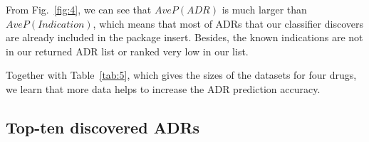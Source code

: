 From Fig.~\ref{fig:4}, we can see that $AveP(ADR)$ is much larger than $AveP(Indication)$, which means that most of ADRs that our classifier discovers are already included in the package insert. Besides, the known indications are not in our returned ADR list or ranked very low in our list.

Together with Table~\ref{tab:5}, which gives the sizes of the datasets for four drugs, we learn that more data helps to increase the ADR prediction accuracy.

\subsection{Top-ten discovered ADRs}
\label{subsec:3.6}

\newcommand{\tabincell}[2]{\begin{tabular}{@{}#1@{}}#2\end{tabular}}
